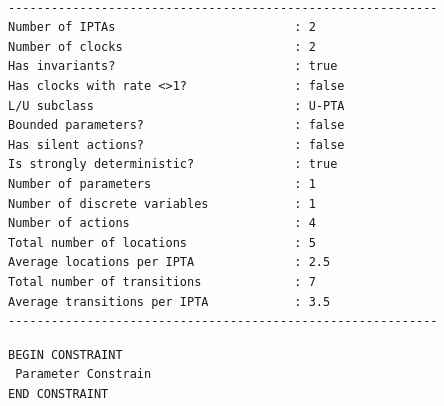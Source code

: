 
\begin{verbatim}
    
------------------------------------------------------------
Number of IPTAs                         : 2
Number of clocks                        : 2
Has invariants?                         : true
Has clocks with rate <>1?               : false
L/U subclass                            : U-PTA
Bounded parameters?                     : false
Has silent actions?                     : false
Is strongly deterministic?              : true
Number of parameters                    : 1
Number of discrete variables            : 1
Number of actions                       : 4
Total number of locations               : 5
Average locations per IPTA              : 2.5
Total number of transitions             : 7
Average transitions per IPTA            : 3.5
------------------------------------------------------------
\end{verbatim}

\begin{tcolorbox}[colframe=red]
\begin{verbatim}
BEGIN CONSTRAINT
 Parameter Constrain
END CONSTRAINT
\end{verbatim}
\end{tcolorbox}

